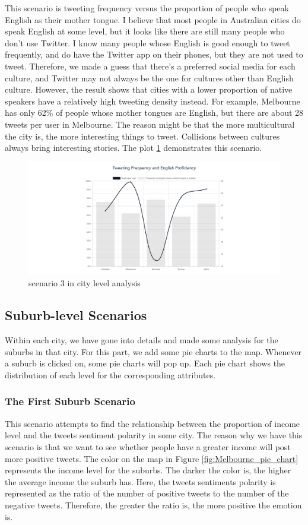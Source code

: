 \documentclass{article}
\begin{document}
This scenario is tweeting frequency versus the proportion of people who speak English as their mother tongue. I believe that most people in Australian cities do speak English at some level, but it looks like there are still many people who don’t use Twitter. I know many people whose English is good enough to tweet frequently, and do have the Twitter app on their phones, but they are not used to tweet. Therefore, we made a guess that there’s a preferred social media for each culture, and Twitter may not always be the one for cultures other than English culture. However, the result shows that cities with a lower proportion of native speakers have a relatively high tweeting density instead. For example, Melbourne has only 62\% of people whose mother tongues are English, but there are about 28 tweets per user in Melbourne. The reason might be that the more multicultural the city is, the more interesting things to tweet. Collisions between cultures always bring interesting stories. The plot 
\ref{fig:Tweeting_and_English} demonstrates this scenario.
\begin{figure}[htp]
\centering
\includegraphics[width=\textwidth]{img/Tweeting_and_English.png}
\caption{scenario 3 in city level analysis}
\label{fig:Tweeting_and_English}
\end{figure} 

\subsection{Suburb-level Scenarios}
Within each city, we have gone into details and made some analysis for the suburbs in that city. For this part, we add some pie charts to the map. Whenever a suburb is clicked on, some pie charts will pop up. Each pie chart shows the distribution of each level for the corresponding attributes.

\subsubsection{The First Suburb Scenario}
This scenario attempts to find the relationship between the proportion of income level and the tweets sentiment polarity in some city. The reason why we have this scenario is that we want to see whether people have a greater income will post more positive tweets. The color on the map in Figure
\ref{fig:Melbourne_pie_chart} represents the income level for the suburbs. The darker the color is, the higher the average income the suburb has. Here, the tweets sentiments polarity is represented as the ratio of the number of positive tweets to the number of the negative tweets. Therefore, the greater the ratio is, the more positive the emotion is. 
\end{document}
